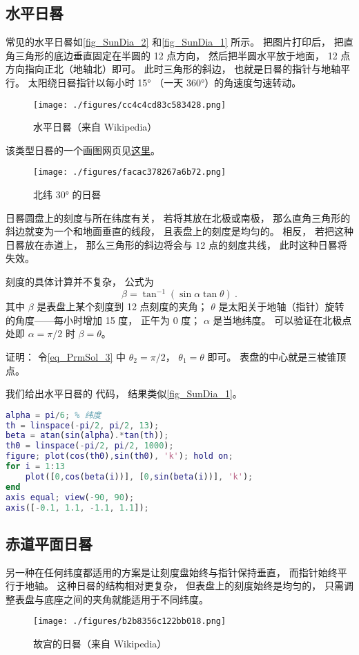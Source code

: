 
\begin{issues}
\end{issues}

\subsection{水平日晷}

常见的水平日晷如\autoref{fig_SunDia_2} 和\autoref{fig_SunDia_1} 所示。 把图片打印后， 把直角三角形的底边垂直固定在半圆的 12 点方向， 然后把半圆水平放于地面， 12 点方向指向正北（地轴北）即可。 此时三角形的斜边， 也就是日晷的指针与地轴平行。 太阳绕日晷指针以每小时 15° （一天 360°）的角速度匀速转动。

\begin{figure}[ht]
\centering
\texttt{[image: ./figures/cc4c4cd83c583428.png]}
\caption{水平日晷（来自 Wikipedia）} \label{fig_SunDia_2}
\end{figure}
该类型日晷的一个画图网页见\href{https://www.blocklayer.com/sundial.aspx}{这里}。
\begin{figure}[ht]
\centering
\texttt{[image: ./figures/facac378267a6b72.png]}
\caption{北纬 30° 的日晷} \label{fig_SunDia_1}
\end{figure}

日晷圆盘上的刻度与所在纬度有关， 若将其放在北极或南极， 那么直角三角形的斜边就变为一个和地面垂直的线段， 且表盘上的刻度是均匀的。 相反， 若把这种日晷放在赤道上， 那么三角形的斜边将会与 12 点的刻度共线， 此时这种日晷将失效。

刻度的具体计算并不复杂， 公式为
\begin{equation}
\beta = \tan^{-1}(\sin\alpha \tan \theta)~.
\end{equation}
其中 $\beta$ 是表盘上某个刻度到 12 点刻度的夹角； $\theta$ 是太阳关于地轴（指针）旋转的角度——每小时增加 15 度， 正午为 0 度； $\alpha$ 是当地纬度。 可以验证在北极点处即 $\alpha = \pi/2$ 时 $\beta = \theta$。

证明： 令\autoref{eq_PrmSol_3}  中 $\theta_2 = \pi/2$， $\theta_1 = \theta$ 即可。 表盘的中心就是三棱锥顶点。

我们给出水平日晷的 代码， 结果类似\autoref{fig_SunDia_1}。
\begin{lstlisting}[language=matlab, caption=sunDial.m]
alpha = pi/6; % 纬度
th = linspace(-pi/2, pi/2, 13);
beta = atan(sin(alpha).*tan(th));
th0 = linspace(-pi/2, pi/2, 1000);
figure; plot(cos(th0),sin(th0), 'k'); hold on;
for i = 1:13
    plot([0,cos(beta(i))], [0,sin(beta(i))], 'k');
end
axis equal; view(-90, 90);
axis([-0.1, 1.1, -1.1, 1.1]);
\end{lstlisting}

\subsection{赤道平面日晷}
另一种在任何纬度都适用的方案是让刻度盘始终与指针保持垂直， 而指针始终平行于地轴。 这种日晷的结构相对更复杂， 但表盘上的刻度始终是均匀的， 只需调整表盘与底座之间的夹角就能适用于不同纬度。
\begin{figure}[ht]
\centering
\texttt{[image: ./figures/b2b8356c122bb018.png]}
\caption{故宫的日晷（来自 Wikipedia）} \label{fig_SunDia_3}
\end{figure}
